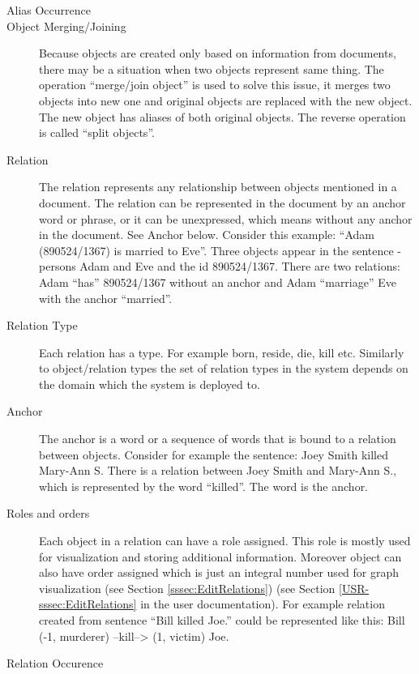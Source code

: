 \begin{description}
\item[Alias Occurrence]

\item[Object Merging/Joining]
Because objects are created only based on information from documents, there may
be a situation when two objects represent same thing. The operation ``merge/join
object'' is used to solve this issue, it merges two objects into new one and
original objects are replaced with the new object. The new object has aliases of
both original objects. The reverse operation is called ``split objects''.

\item[Relation]
The relation represents any relationship between objects mentioned in a
document. The relation can be represented in the document by an anchor word or
phrase, or it can be unexpressed, which means without any anchor in the
document. See Anchor below.
Consider this example: ``Adam (890524/1367) is married to Eve''. Three objects
appear in the sentence - persons Adam and Eve and the id 890524/1367. There
are two relations: Adam ``has'' 890524/1367 without an anchor and Adam ``marriage''
Eve with the anchor ``married''.

\item[Relation Type]
Each relation has a type. For example born, reside, die, kill etc. Similarly to
object/relation types the set of relation types in the system depends on the
domain which the system is deployed to.

\item[Anchor]
The anchor is a word or a sequence of words that is bound to a relation between
objects. Consider for example the sentence: Joey Smith killed Mary-Ann S. There
is a relation between Joey Smith and Mary-Ann S., which is represented by the
word ``killed''. The word is the anchor.

\item[Roles and orders]
Each object in a relation can have a role assigned. This role is mostly used
for visualization and storing additional information. Moreover object can also
have order assigned which is just an integral number used for graph
visualization\ifdefined\USRDOC{} (see Section \ref{sssec:EditRelations})\fi{}
\ifdefined\DEVDOC{} (see Section \ref{USR-sssec:EditRelations} in the user
documentation)\fi{}. For example relation created from sentence
``Bill killed Joe.'' could be represented like this:
Bill (-1, murderer) --kill--> (1, victim) Joe.

\item[Relation Occurence]
\end{description}

